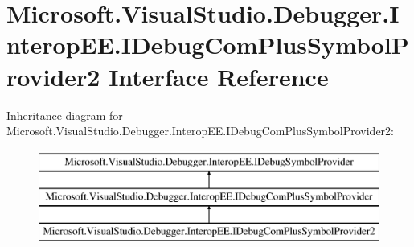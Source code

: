 \hypertarget{interface_microsoft_1_1_visual_studio_1_1_debugger_1_1_interop_e_e_1_1_i_debug_com_plus_symbol_provider2}{\section{Microsoft.\+Visual\+Studio.\+Debugger.\+Interop\+E\+E.\+I\+Debug\+Com\+Plus\+Symbol\+Provider2 Interface Reference}
\label{interface_microsoft_1_1_visual_studio_1_1_debugger_1_1_interop_e_e_1_1_i_debug_com_plus_symbol_provider2}
}
Inheritance diagram for Microsoft.\+Visual\+Studio.\+Debugger.\+Interop\+E\+E.\+I\+Debug\+Com\+Plus\+Symbol\+Provider2\+:\begin{figure}[H]
\begin{center}
\leavevmode
\includegraphics[height=3.000000cm]{interface_microsoft_1_1_visual_studio_1_1_debugger_1_1_interop_e_e_1_1_i_debug_com_plus_symbol_provider2}
\end{center}
\end{figure}
